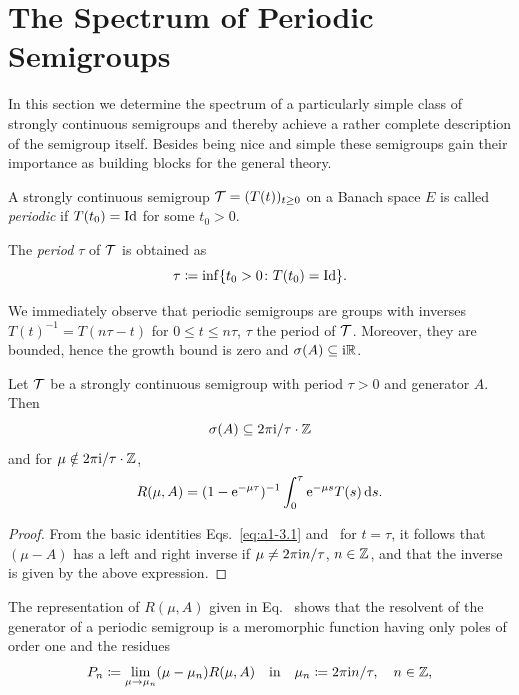 \section{The Spectrum of Periodic Semigroups} \label{sec:a3-5}
In this section we determine the spectrum of a particularly simple class of strongly continuous semigroups and thereby achieve a rather complete description of the semigroup itself.
Besides being nice and simple these semigroups gain their importance as building blocks for the general theory.
\begin{definition}\label{def:a3-5.1}
A strongly continuous semigroup $\TT = (T(t))_{t \geq 0}$ on a Banach space $E$ is called \emph{periodic} if\/ $T(t_{0}) = \operatorname{Id}$ for some $t_{0} > 0$.

The \emph{period} $\tau$ of\/ $\mathcal{T}$ is obtained as 
%
\[
	\tau \coloneq \inf\{t_{0} > 0 \colon T(t_{0}) = \operatorname{Id}\} .
\]
%
\end{definition}
We immediately observe that periodic semigroups are groups with inverses $T(t)^{-1} = T(n\tau-t)$ for $0 \leq t \leq n\tau$, $\tau$ the period of\/ $\mathcal{T}$.
Moreover, they are bounded, hence the growth bound is zero and $\sigma(A) \subseteq \mathrm{i}\mathbb{R}$.
\begin{lemma}\label{lem:a3-5.2}
Let $\mathcal{T}$ be a strongly continuous semigroup with period $\tau > 0$ and generator $A$.
Then
\[
\sigma(A) \subseteq 2\pi \mathrm{i}/\tau\cdot\mathbb{Z}
\]
and for $\mu \notin 2\pi\mathrm{i} /\tau\cdot\mathbb{Z}$,
\begin{equation}\label{eq:a3-5.1}
R(\mu,A) = (1-\mathrm{e}^{-\mu\tau})^{-1} \int_{0}^{\tau}\mathrm{e}^{-\mu s}T(s) \mathop{}\!\mathrm{d}{s} .
\end{equation}
\end{lemma}
\begin{proof}
From the basic identities Eqs.~\eqref{eq:a1-3.1} and~ for $t = \tau$, it follows that $(\mu - A)$ has a left and right inverse if\/ $\mu \neq 2\pi\mathrm{i} n/\tau$, $n \in \mathbb{Z}$, and that the inverse is given by the above expression.
\end{proof}
The representation of\/ $R(\mu,A)$ given in Eq.~ shows that the resolvent of the generator of a periodic semigroup is a meromorphic function having only poles of order one and the residues
\[
P_{n} \coloneq \lim_{\mu \to \mu_{n}} (\mu-\mu_{n})R(\mu,A) \quad \text{in} \quad \mu_{n} \coloneq 2\pi\mathrm{i} n/\tau, \quad n \in \mathbb{Z} ,
\]
